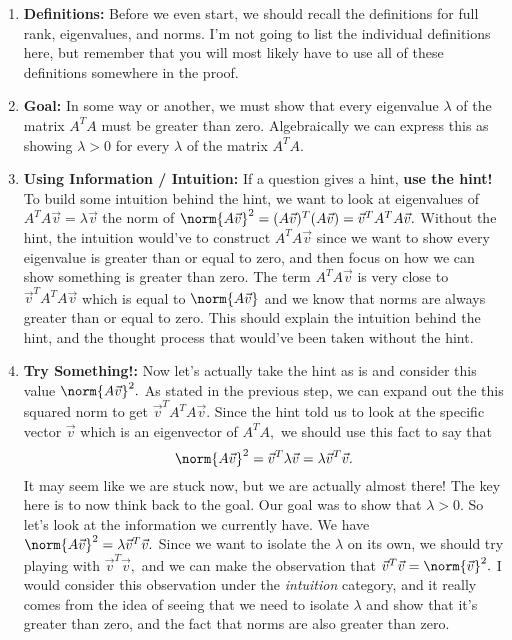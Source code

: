 \begin{enumerate}
 \item \textbf{Definitions:} Before we even start, we should recall the definitions for full rank, eigenvalues, and norms. 
 I'm not going to list the individual definitions here, but remember that you will most likely have to use all of these definitions somewhere in the proof.
 \item \textbf{Goal:} In some way or another, we must show that every eigenvalue $\lambda$ of the matrix $A^{T}A$ must be greater than zero. Algebraically we can express this as showing $\lambda > 0$ for every $\lambda$ of the matrix $A^{T}A.$
 \item \textbf{Using Information / Intuition:} If a question gives a hint, \textbf{use the hint!} To build some intuition behind the hint, we want to look at eigenvalues of $A^{T}A \vec{v} = \lambda \vec{v}$ the norm of $\norm{A\vec{v}}^{2} = (A \vec{v})^{T} (A \vec{v}) = \vec{v}^{T} A^{T} A \vec{v}.$ 
 Without the hint, the intuition would've to construct $A^{T}A \vec{v}$ since we want to show every eigenvalue is greater than or equal to zero, and then focus on how we can show something is greater than zero. 
 The term $A^{T}A \vec{v}$ is very close to $\vec{v}^{T} A^{T} A \vec{v}$ which is equal to $\norm{A \vec{v}}$ and we know that norms are always greater than or equal to zero.
 This should explain the intuition behind the hint, and the thought process that would've been taken without the hint.
 \item \textbf{Try Something!:} Now let's actually take the hint as is and consider this value $\norm{A\vec{v}}^{2}.$ 
 As stated in the previous step, we can expand out the this squared norm to get $\vec{v}^{T} A^{T} A \vec{v}.$
 Since the hint told us to look at the specific vector $\vec{v}$ which is an eigenvector of $A^{T}A,$ we should use this fact to say that $$\norm{A \vec{v}}^{2} = \vec{v}^{T} \lambda \vec{v} = \lambda \vec{v}^{T} \vec{v}.$$
 It may seem like we are stuck now, but we are actually almost there! 
 The key here is to now think back to the goal. 
 Our goal was to show that $\lambda > 0.$ 
 So let's look at the information we currently have. We have $\norm{A \vec{v}}^{2} = \lambda \vec{v}^{T} \vec{v}.$
 Since we want to isolate the $\lambda$ on its own, we should try playing with $\vec{v}^{T} \vec{v},$ and we can make the observation that $\vec{v}^{T} \vec{v} = \norm{\vec{v}}^{2}.$ 
 I would consider this observation under the \textit{intuition} category, and it really comes from the idea of seeing that we need to isolate $\lambda$ and show that it's greater than zero, and the fact that norms are also greater than zero. 

\end{enumerate}
